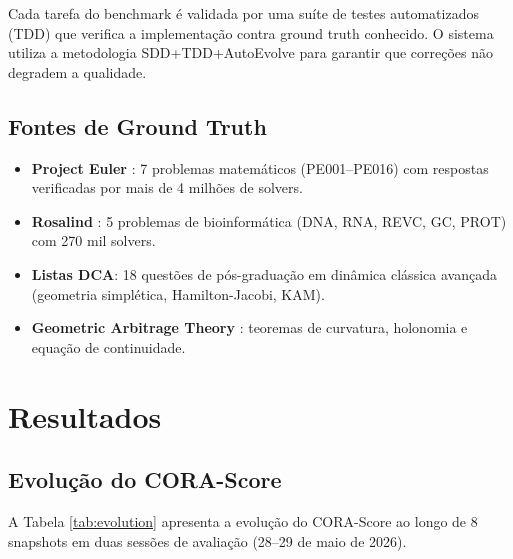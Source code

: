 \documentclass[12pt,a4paper]{article}
\begin{document}
Cada tarefa do benchmark é validada por uma suíte de testes automatizados (TDD)
que verifica a implementação contra ground truth conhecido. O sistema utiliza
a metodologia SDD+TDD+AutoEvolve \cite{opencode2026} para garantir que
correções não degradem a qualidade.

\subsection{Fontes de Ground Truth}

\begin{itemize}
\item \textbf{Project Euler} \cite{projecteuler}: 7 problemas matemáticos
      (PE001--PE016) com respostas verificadas por mais de 4 milhões de solvers.
\item \textbf{Rosalind} \cite{rosalind}: 5 problemas de bioinformática
      (DNA, RNA, REVC, GC, PROT) com 270 mil solvers.
\item \textbf{Listas DCA}: 18 questões de pós-graduação em dinâmica clássica
      avançada (geometria simplética, Hamilton-Jacobi, KAM).
\item \textbf{Geometric Arbitrage Theory} \cite{faradinelli2021gat}: teoremas
      de curvatura, holonomia e equação de continuidade.
\end{itemize}

\section{Resultados}

\subsection{Evolução do CORA-Score}

A Tabela \ref{tab:evolution} apresenta a evolução do CORA-Score ao longo de
8 snapshots em duas sessões de avaliação (28--29 de maio de 2026).
\end{document}
